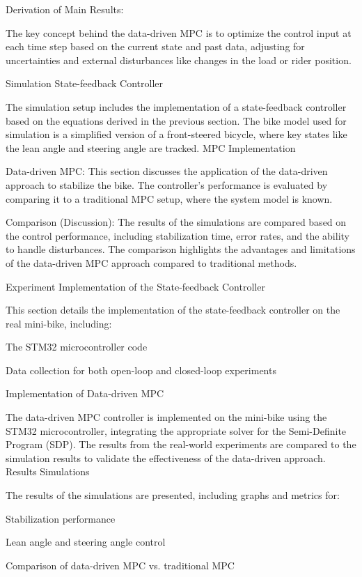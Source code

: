 Derivation of Main Results:

The key concept behind the data-driven MPC is to optimize the control input at each time step based on the current state and past data, adjusting for uncertainties and external disturbances like changes in the load or rider position.

Simulation
State-feedback Controller

The simulation setup includes the implementation of a state-feedback controller based on the equations derived in the previous section. The bike model used for simulation is a simplified version of a front-steered bicycle, where key states like the lean angle and steering angle are tracked.
MPC Implementation

Data-driven MPC: This section discusses the application of the data-driven approach to stabilize the bike. The controller’s performance is evaluated by comparing it to a traditional MPC setup, where the system model is known.

Comparison (Discussion):
The results of the simulations are compared based on the control performance, including stabilization time, error rates, and the ability to handle disturbances. The comparison highlights the advantages and limitations of the data-driven MPC approach compared to traditional methods.

Experiment
Implementation of the State-feedback Controller

This section details the implementation of the state-feedback controller on the real mini-bike, including:

The STM32 microcontroller code

Data collection for both open-loop and closed-loop experiments

Implementation of Data-driven MPC

The data-driven MPC controller is implemented on the mini-bike using the STM32 microcontroller, integrating the appropriate solver for the Semi-Definite Program (SDP). The results from the real-world experiments are compared to the simulation results to validate the effectiveness of the data-driven approach.
Results
Simulations

The results of the simulations are presented, including graphs and metrics for:

Stabilization performance

Lean angle and steering angle control

Comparison of data-driven MPC vs. traditional MPC

